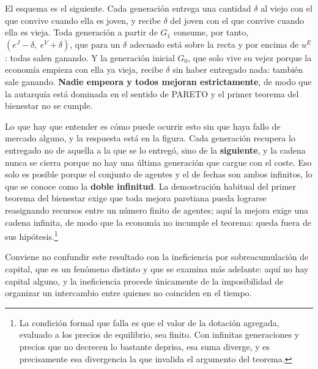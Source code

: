 \documentclass[10pt,a4paper]{article}
\begin{document}
El esquema es el siguiente. Cada generación entrega una cantidad $\delta$ al viejo con el que convive cuando ella es joven, y recibe $\delta$ del joven con el que convive cuando ella es vieja. Toda generación a partir de $G_1$ consume, por tanto, $(e^{J}-\delta,\ e^{V}+\delta)$, que para un $\delta$ adecuado está sobre la recta y por encima de $u^{E}$: todas salen ganando. Y la generación inicial $G_0$, que solo vive su vejez porque la economía empieza con ella ya vieja, recibe $\delta$ sin haber entregado nada: también sale ganando. \textbf{Nadie empeora y todos mejoran estrictamente}, de modo que la autarquía está dominada en el sentido de PARETO y el primer teorema del bienestar no se cumple.

Lo que hay que entender es cómo puede ocurrir esto sin que haya fallo de mercado alguno, y la respuesta está en la figura. Cada generación recupera lo entregado no de aquella a la que se lo entregó, sino de la \textbf{siguiente}, y la cadena nunca se cierra porque no hay una última generación que cargue con el coste. Eso solo es posible porque el conjunto de agentes y el de fechas son ambos infinitos, lo que se conoce como la \textbf{doble infinitud}. La demostración habitual del primer teorema del bienestar exige que toda mejora paretiana pueda lograrse reasignando recursos entre un número finito de agentes; aquí la mejora exige una cadena infinita, de modo que la economía no incumple el teorema: queda fuera de sus hipótesis.\footnote{%
    La condición formal que falla es que el valor de la dotación agregada, evaluado a los precios de equilibrio, sea finito. Con infinitas generaciones y precios que no decrecen lo bastante deprisa, esa suma diverge, y es precisamente esa divergencia la que invalida el argumento del teorema.
}

Conviene no confundir este resultado con la ineficiencia por sobreacumulación de capital, que es un fenómeno distinto y que se examina más adelante: aquí no hay capital alguno, y la ineficiencia procede únicamente de la imposibilidad de organizar un intercambio entre quienes no coinciden en el tiempo.
\end{document}
